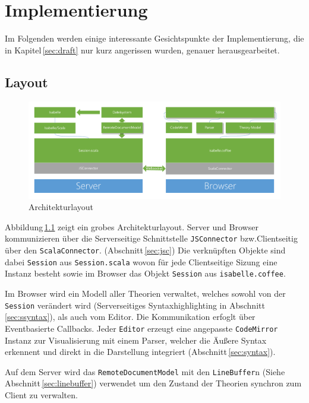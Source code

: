 \chapter{Implementierung}
\label{sec:imp}

Im Folgenden werden einige interessante Gesichtspunkte der Implementierung, die in
Kapitel\,\ref{sec:draft} nur kurz angerissen wurden, genauer herausgearbeitet.

\section{Layout}
\label{sec:layout}

\begin{figure}[ht]
\includegraphics[width=\linewidth]{images/layout}
  \caption{Architekturlayout}
  \label{fig:layout}
\end{figure}

Abbildung\,\ref{fig:layout} zeigt ein grobes Architekturlayout. Server und Browser kommunizieren
über die Serverseitige Schnittstelle \texttt{JSConnector} bzw.Clientseitig über den
\texttt{ScalaConnector}. (Abschnitt\,\ref{sec:jsc}) Die verknüpften Objekte sind dabei
\texttt{Session} aus \texttt{Session.scala} wovon für jede Clientseitige Sizung eine Instanz besteht
sowie im Browser das Objekt \texttt{Session} aus \texttt{isabelle.coffee}.

Im Browser wird ein Modell aller Theorien verwaltet, welches sowohl von der \texttt{Session}
verändert wird (Serverseitiges Syntaxhighlighting in Abschnitt\,\ref{sec:ssyntax}), als auch vom
Editor. Die Kommunikation erfoglt über Eventbasierte Callbacks. Jeder \texttt{Editor} erzeugt eine
angepasste \texttt{CodeMirror} Instanz zur Visualisierung mit einem Parser, welcher die Äußere
Syntax erkennent und direkt in die Darstellung integriert (Abschnitt\,\ref{sec:syntax}).

Auf dem Server wird das \texttt{RemoteDocumentModel} mit den \texttt{LineBuffer}n (Siehe
Abschnitt\,\ref{sec:linebuffer}) verwendet um den Zustand der Theorien synchron zum Client zu
verwalten.

